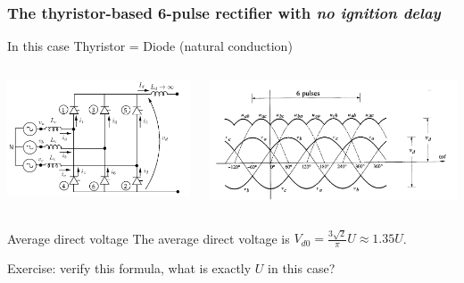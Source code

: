 \begin{frame}
\frametitle{The thyristor-based 6-pulse rectifier with \textit{no ignition delay}}
In this case Thyristor = Diode (natural conduction)
\begin{columns}
\begin{column}{0.4\linewidth}
\begin{center}
    \includegraphics[width=1.0\linewidth]{images/6pulsebridge.png}
\end{center}
\end{column}
\begin{column}{0.55\linewidth}
\begin{center}
    \includegraphics[width=1.0\linewidth]{images/6pulsevolt1.png}
\end{center}
\end{column}
\end{columns}

\begin{block}{Average direct voltage}
The {average direct voltage} is $V_{d0} = \frac{3\sqrt{2}}{\pi} U \approx 1.35 U$.

Exercise: verify this formula, what is exactly $U$ in this case? 
\end{block}



\end{frame}

